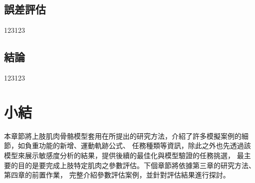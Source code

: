 \subsection{誤差評估}
123123
\subsection{結論}
123123

\section{小結}
本章節將上肢肌肉骨骼模型套用在所提出的研究方法，介紹了許多模擬案例的細節，如負重功能的新增、運動軌跡公式、
任務種類等資訊，除此之外也先透過該模型來展示敏感度分析的結果，提供後續的最佳化與模型驗證的任務挑選，
最主要的目的是要完成上肢特定肌肉之參數評估。下個章節將依據第三章的研究方法、第四章的前置作業，
完整介紹參數評估案例，並針對評估結果進行探討。

\clearpage